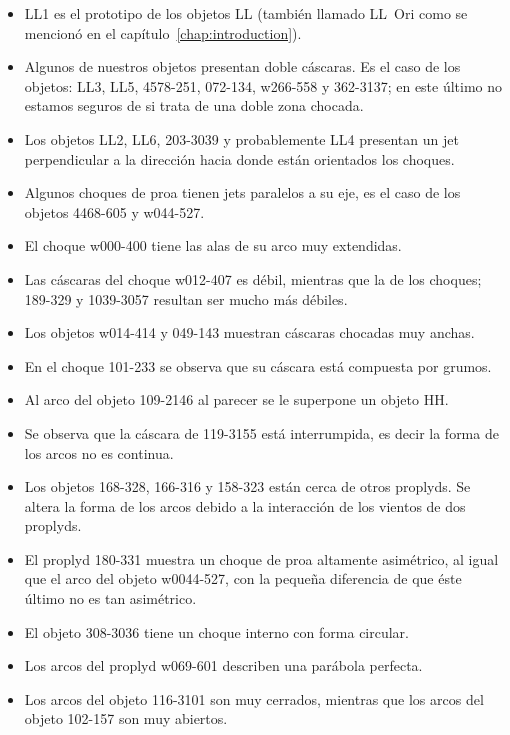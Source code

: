 \begin{itemize}
\item LL1 es el prototipo de los objetos LL  (también llamado LL~Ori como se mencionó en el capítulo~\ref{chap:introduction}).
\item Algunos de nuestros objetos presentan doble cáscaras. Es el caso de los objetos: LL3, LL5, 4578-251, 072-134, w266-558 y 362-3137; en este último no estamos seguros de si trata de una doble zona chocada.  
\item Los objetos LL2, LL6, 203-3039 y probablemente LL4 presentan un jet perpendicular a la dirección hacia donde están orientados los choques.
\item Algunos choques de proa tienen jets paralelos a su eje, es el caso de los objetos 4468-605 y w044-527.
\item El choque w000-400 tiene las alas de su arco muy extendidas.
\item Las cáscaras del choque w012-407 es débil, mientras que la de los choques; 189-329 y 1039-3057 resultan ser mucho más débiles.
\item Los objetos w014-414 y 049-143 muestran cáscaras chocadas muy anchas.
\item En el choque 101-233 se observa que su cáscara está compuesta por grumos.
\item Al arco del objeto 109-2146 al parecer se le superpone un objeto HH.
\item Se observa que la cáscara de 119-3155 está interrumpida, es decir la forma de los arcos no es continua.
\item Los objetos 168-328, 166-316 y 158-323 están cerca de otros proplyds. Se altera la forma de los arcos debido a la interacción de los vientos de dos proplyds.  
\item El proplyd 180-331 muestra un choque de proa altamente asimétrico, al igual que el arco del objeto w0044-527, con la pequeña  diferencia de que éste último no es tan asimétrico.
\item El objeto 308-3036 tiene un choque interno con forma circular.
\item Los arcos del proplyd w069-601 describen una parábola perfecta.
\item Los arcos del objeto 116-3101 son muy cerrados, mientras que los arcos del objeto 102-157 son muy abiertos.

\end{itemize}


\setlength{\fboxsep}{0pt}%

\newlength\figwidth
\setlength{}



